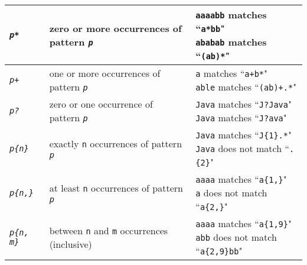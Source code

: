 \begin{itemize}
\begin{tabular}{l l l}
		\hline
		\texttt{\emph{p*}} & zero or more occurrences of pattern \texttt{\emph{p}} & \makecell[cc]{\texttt{aaaabb} matches ``\texttt{a*bb}" \\ \texttt{ababab} matches ``\texttt{(ab)*}"}\\
		\hline
		\texttt{\emph{p+}} & one or more occurrences of pattern \texttt{\emph{p}} & \makecell[cc]{\texttt{a} matches ``\texttt{a+b*}" \\ \texttt{able} matches ``\texttt{(ab)+.*}"}\\
		\hline
		\texttt{\emph{p?}} & zero or one occurrence of pattern \texttt{\emph{p}} & \makecell[cc]{\texttt{Java} matches ``\texttt{J?Java}" \\ \texttt{Java} matches ``\texttt{J?ava}"}\\
		\hline
		\texttt{\emph{p\{n\}}} & exactly \texttt{n} occurrences of pattern \texttt{\emph{p}} & \makecell[cc]{\texttt{Java} matches ``\texttt{J\{1\}.*}" \\ \texttt{Java} does not match ``\texttt{.\{2\}}"}\\
		\hline
		\texttt{\emph{p\{n,\}}} & at least \texttt{n} occurrences of pattern \texttt{\emph{p}} & \makecell[cc]{\texttt{aaaa} matches ``\texttt{a\{1,\}}" \\ \texttt{a} does not match ``\texttt{a\{2,\}}"}\\
		\hline
		\texttt{\emph{p\{n, m\}}} & between \texttt{n} and \texttt{m} occurrences (inclusive) & \makecell[cc]{\texttt{aaaa} matches ``\texttt{a\{1,9\}}" \\ \texttt{abb} does not match ``\texttt{a\{2,9\}bb}"}\\
	\end{tabular}

\end{itemize}


%